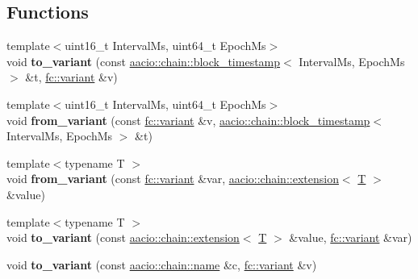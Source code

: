 \subsection*{Functions}
\begin{DoxyCompactItemize}
\item 
\mbox{\label{namespacefc_a0d9cd9c9f08190069e6c12e5ae1ff9e3}} 
{\footnotesize template$<$uint16\+\_\+t Interval\+Ms, uint64\+\_\+t Epoch\+Ms$>$ }\\void {\bfseries to\+\_\+variant} (const \mbox{\hyperlink{classaacio_1_1chain_1_1block__timestamp}{aacio\+::chain\+::block\+\_\+timestamp}}$<$ Interval\+Ms, Epoch\+Ms $>$ \&t, \mbox{\hyperlink{classfc_1_1variant}{fc\+::variant}} \&v)
\item 
\mbox{\label{namespacefc_a8a53e8125b5b58ce77e07b400d4e51f4}} 
{\footnotesize template$<$uint16\+\_\+t Interval\+Ms, uint64\+\_\+t Epoch\+Ms$>$ }\\void {\bfseries from\+\_\+variant} (const \mbox{\hyperlink{classfc_1_1variant}{fc\+::variant}} \&v, \mbox{\hyperlink{classaacio_1_1chain_1_1block__timestamp}{aacio\+::chain\+::block\+\_\+timestamp}}$<$ Interval\+Ms, Epoch\+Ms $>$ \&t)
\item 
\mbox{\label{namespacefc_a5495d902a1aa3740e1b4fd5aa1833fd7}} 
{\footnotesize template$<$typename T $>$ }\\void {\bfseries from\+\_\+variant} (const \mbox{\hyperlink{classfc_1_1variant}{fc\+::variant}} \&var, \mbox{\hyperlink{structaacio_1_1chain_1_1extension}{aacio\+::chain\+::extension}}$<$ \mbox{\hyperlink{struct_t}{T}} $>$ \&value)
\item 
\mbox{\label{namespacefc_a7a8fb31b44876f637ed08f351833dc2a}} 
{\footnotesize template$<$typename T $>$ }\\void {\bfseries to\+\_\+variant} (const \mbox{\hyperlink{structaacio_1_1chain_1_1extension}{aacio\+::chain\+::extension}}$<$ \mbox{\hyperlink{struct_t}{T}} $>$ \&value, \mbox{\hyperlink{classfc_1_1variant}{fc\+::variant}} \&var)
\item 
\mbox{\label{namespacefc_a68d266fc870d23bcecf87468f7fb93ea}} 
void {\bfseries to\+\_\+variant} (const \mbox{\hyperlink{structaacio_1_1chain_1_1name}{aacio\+::chain\+::name}} \&c, \mbox{\hyperlink{classfc_1_1variant}{fc\+::variant}} \&v)

\end{DoxyCompactItemize}
